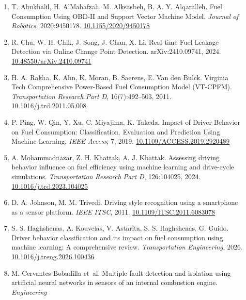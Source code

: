 \begin{enumerate}
\item
  \label{r9}{T. Abukhalil, H. AlMahafzah, M. Alksasbeh,
  B. A. Y. Alqaralleh. Fuel Consumption Using OBD-II and Support Vector
  Machine Model. \emph{Journal of Robotics}, 2020:9450178.
  \href{https://doi.org/10.1155/2020/9450178}{10.1155/2020/9450178}}
\item
  \label{r10}{R. Chu, W. H. Chik, J. Song, J. Chan, X.
  Li. Real-time Fuel Leakage Detection via Online Change Point
  Detection. arXiv:2410.09741, 2024.
  \href{https://doi.org/10.48550/arXiv.2410.09741}{10.48550/arXiv.2410.09741}}
\item
  \label{r11}{H. A. Rakha, K. Ahn, K. Moran, B. Saerens,
  E. Van den Bulck. Virginia Tech Comprehensive Power-Based Fuel
  Consumption Model (VT-CPFM). \emph{Transportation Research Part D},
  16(7):492--503, 2011.
  \href{https://doi.org/10.1016/j.trd.2011.05.008}{10.1016/j.trd.2011.05.008}}
\item
  \label{r12}{P. Ping, W. Qin, Y. Xu, C. Miyajima, K.
  Takeda. Impact of Driver Behavior on Fuel Consumption: Classification,
  Evaluation and Prediction Using Machine Learning. \emph{IEEE Access},
  7, 2019.
  \href{https://doi.org/10.1109/ACCESS.2019.2920489}{10.1109/ACCESS.2019.2920489}}
\item
  \label{r13}{A. Mohammadnazar, Z. H. Khattak, A. J.
  Khattak. Assessing driving behavior influence on fuel efficiency using
  machine learning and drive-cycle simulations. \emph{Transportation
  Research Part D}, 126:104025, 2024.
  \href{https://doi.org/10.1016/j.trd.2023.104025}{10.1016/j.trd.2023.104025}}
\item
  \label{r14}{D. A. Johnson, M. M. Trivedi. Driving style
  recognition using a smartphone as a sensor platform. \emph{IEEE ITSC},
  2011.
  \href{https://doi.org/10.1109/ITSC.2011.6083078}{10.1109/ITSC.2011.6083078}}
\item
  \label{r15}{S. S. Haghshenas, A. Kouvelas, V. Astarita,
  S. S. Haghshenas, G. Guido. Driver behavior classification and its
  impact on fuel consumption using machine learning: A comprehensive
  review. \emph{Transportation Engineering}, 2026.
  \href{https://doi.org/10.1016/j.treng.2026.100436}{10.1016/j.treng.2026.100436}}
\item
  \label{r16}{M. Cervantes-Bobadilla et~al. Multiple
  fault detection and isolation using artificial neural networks in
  sensors of an internal combustion engine. \emph{Engineering
}}
\end{enumerate}
